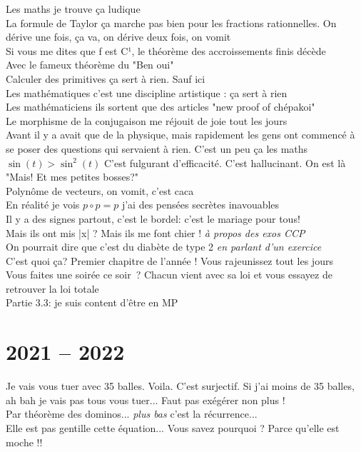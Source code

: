 \documentclass[french, a4paper, openany]{book}
\begin{document}
	\noindent \og Les maths je trouve ça ludique \fg \\
	\og La formule de Taylor ça marche pas bien pour les fractions rationnelles. On dérive une fois, ça va, on dérive deux fois, on vomit \fg \\
	\og Si vous me dites que f est C¹, le théorème des accroissements finis décède \fg \\
	\og Avec le fameux théorème du "Ben oui" \fg \\
	\og Calculer des primitives ça sert à rien. Sauf ici \fg \\
	\og Les mathématiques c'est une discipline artistique : ça sert à rien \fg \\
	\og Les mathématiciens ils sortent que des articles "new proof of chépakoi" \fg \\
	\og Le morphisme de la conjugaison me réjouit de joie tout les jours \fg \\
	\og Avant il y a avait que de la physique, mais rapidement les gens ont commencé à se poser des questions qui servaient à rien. C'est un peu ça les maths \fg \\
	$\sin(t) > \sin^2(t)$ \og C'est fulgurant d'efficacité. C'est hallucinant. On est là "Mais! Et mes petites bosses?" \fg \\
	\og Polynôme de vecteurs, on vomit, c'est caca \fg \\
	\og En réalité je vois $p \circ p = p$ j'ai des pensées secrètes inavouables \fg \\
	\og Il y a des signes partout, c'est le bordel: c'est le mariage pour tous! \fg \\
	\og Mais ils ont mis |x| ? Mais ils me font chier ! \fg \emph{à propos des exos CCP} \\
	\og On pourrait dire que c'est du diabète de type 2 \fg \emph{en parlant d'un exercice} \\
	\og C'est quoi ça? Premier chapitre de l'année ! Vous rajeunissez tout les jours \fg \\
	\og Vous faites une soirée ce soir~? Chacun vient avec sa loi et vous essayez de retrouver la loi totale \fg \\
	\og Partie 3.3: je suis content d'être en MP \fg \\

\section{2021 -- 2022}

	\noindent \og Je vais vous tuer avec 35 balles. Voila. C'est surjectif. Si j'ai moins de 35 balles, ah bah je vais pas tous vous tuer... Faut pas exégérer non plus ! \fg \\
	\og Par théorème des dominos... \emph{plus bas} c'est la récurrence... \fg \\
	\og Elle est pas gentille cette équation... Vous savez pourquoi ? Parce qu'elle est moche !! \fg \\
\end{document}
